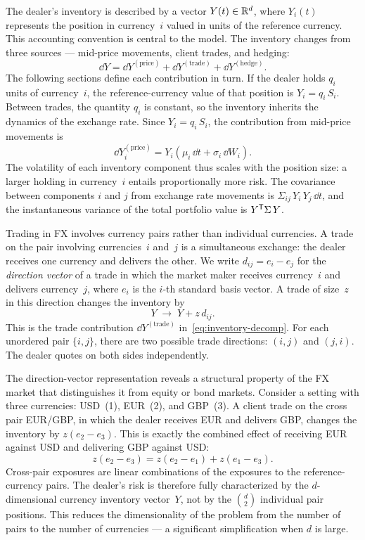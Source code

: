 The dealer's inventory is described by a vector $Y(t) \in \mathbb{R}^d$, where $Y_i(t)$ represents the position in currency~$i$ valued in units of the reference currency. This accounting convention is central to the model. The inventory changes from three sources --- mid-price movements, client trades, and hedging:
\begin{equation}
  \label{eq:inventory-decomp}
  \dd Y = \dd Y^{(\text{price})} + \dd Y^{(\text{trade})} + \dd Y^{(\text{hedge})}.
\end{equation}
The following sections define each contribution in turn. If the dealer holds $q_i$ units of currency~$i$, the reference-currency value of that position is $Y_i = q_i\,S_i$. Between trades, the quantity $q_i$ is constant, so the inventory inherits the dynamics of the exchange rate. Since $Y_i = q_i\,S_i$, the contribution from mid-price movements is
\begin{equation}
  \label{eq:inventory-mid}
  \dd Y_i^{(\text{price})} = Y_i\!\left(\mu_i \, \dd t + \sigma_i \, \dd W_i\right).
\end{equation}
The volatility of each inventory component thus scales with the position size: a larger holding in currency~$i$ entails proportionally more risk. The covariance between components $i$ and $j$ from exchange rate movements is $\Sigma_{ij}\,Y_i\,Y_j\,\dd t$, and the instantaneous variance of the total portfolio value is $Y^{\mathsf{T}}\Sigma\,Y$.

Trading in FX involves currency pairs rather than individual currencies. A trade on the pair involving currencies~$i$ and~$j$ is a simultaneous exchange: the dealer receives one currency and delivers the other. We write $d_{ij} = e_i - e_j$ for the \emph{direction vector} of a trade in which the market maker receives currency~$i$ and delivers currency~$j$, where $e_i$ is the $i$-th standard basis vector. A trade of size~$z$ in this direction changes the inventory by
\begin{equation}
  \label{eq:inventory-trade}
  Y \;\longrightarrow\; Y + z\,d_{ij}.
\end{equation}
This is the trade contribution $\dd Y^{(\text{trade})}$ in~\eqref{eq:inventory-decomp}. For each unordered pair $\{i, j\}$, there are two possible trade directions: $(i,j)$ and $(j,i)$. The dealer quotes on both sides independently.

The direction-vector representation reveals a structural property of the FX market that distinguishes it from equity or bond markets. Consider a setting with three currencies: USD~(1), EUR~(2), and GBP~(3). A client trade on the cross pair EUR/GBP, in which the dealer receives EUR and delivers GBP, changes the inventory by $z(e_2 - e_3)$. This is exactly the combined effect of receiving EUR against USD and delivering GBP against USD:
\[
  z(e_2 - e_3) = z(e_2 - e_1) + z(e_1 - e_3).
\]
Cross-pair exposures are linear combinations of the exposures to the reference-currency pairs. The dealer's risk is therefore fully characterized by the $d$-dimensional currency inventory vector~$Y$, not by the $\binom{d}{2}$ individual pair positions. This reduces the dimensionality of the problem from the number of pairs to the number of currencies --- a significant simplification when $d$ is large.

